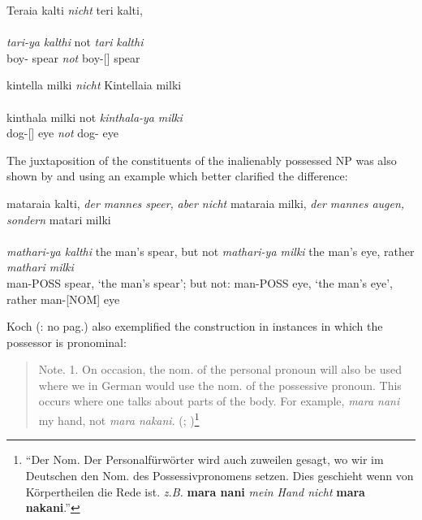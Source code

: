 \ea\label{bkm:Ref329628748}
{Teraia         kalti{} {\textit{nicht}}   teri kalti,} \\
\\
\gll    \textit{tari-ya}        \textit{kalthi} not  \textit{tari}   \textit{kalthi}\\
boy-  spear       \textit{not}    boy-[] spear\\
\z

\ea   \label{bkm:Ref329628762}
{kintella     milki   {\textit{nicht}}{} Kintellaia milki} \\
\\
\gll kinthala      milki not  \textit{kinthala-ya}   \textit{milki}\\
dog-[]   eye   \textit{not} dog-   eye\\
\z

The juxtaposition of the constituents of the inalienably possessed NP was also shown by \citet[3]{schoknecht_grammar_1947} and \citet[12]{flierl_dieri_1880} using an example which better clarified the difference:

\newpage
\ea          mataraia kalti, {\textit{der mannes speer,}} {\textit{aber nicht}} mataraia milki, {\textit{der mannes augen, sondern}}{} matari milki\\
\citep[12]{flierl_dieri_1880}\\
 \textit{mathari-ya kalthi} the man’s spear, but not      \textit{mathari-ya milki} the man’s eye,      rather       \textit{mathari  milki} \\
man-POSS spear, `the man’s spear'; but not:    man-POSS eye, `the man’s eye', rather     man-[NOM] eye
\z

Koch (\citeyear{koch_untitled_1868}: no pag.) also exemplified the construction in instances in which the possessor is pronominal:

\begin{quote}
Note. 1. On occasion, the nom. of the personal pronoun will also be used where we in German would use the nom. of the possessive pronoun. This occurs where one talks about parts of the body. For example, \textit{mara nani} my hand, not \textit{mara nakani}. (\citealt[no pag.]{koch_untitled_1868}; )\footnote{``Der Nom. Der Personalfürwörter wird auch zuweilen gesagt, wo wir im Deutschen den Nom. des Possessivpronomens setzen. Dies geschieht wenn von Körpertheilen die Rede ist. \textit{z.B.} \textbf{mara nani} \textit{mein Hand nicht} \textbf{mara nakani}.''}
\end{quote}



